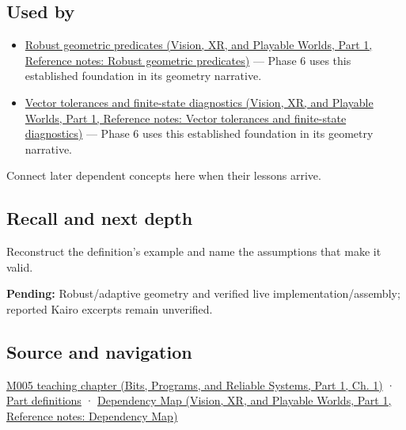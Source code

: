 \subsection{Used by}\label{appendix-5aef4f13483a-used-by}

\hypertarget{appendix-5aef4f13483a-used-by}{}

\begin{itemize}
\tightlist
\item
  \href{../07-Vision-XR-and-Playable-Worlds-P01/main.pdf\#nameddest=appendix-341296fb3f64}{Robust geometric predicates (Vision, XR, and Playable Worlds, Part 1, Reference notes: Robust geometric predicates)} --- Phase 6 uses this established foundation in its geometry narrative.
\item
  \href{../07-Vision-XR-and-Playable-Worlds-P01/main.pdf\#nameddest=appendix-b5b83329215b}{Vector tolerances and finite-state diagnostics (Vision, XR, and Playable Worlds, Part 1, Reference notes: Vector tolerances and finite-state diagnostics)} --- Phase 6 uses this established foundation in its geometry narrative.
\end{itemize}

Connect later dependent concepts here when their lessons arrive.

\subsection{Recall and next depth}\label{appendix-5aef4f13483a-recall-and-next-depth}

\hypertarget{appendix-5aef4f13483a-recall-and-next-depth}{}

Reconstruct the definition's example and name the assumptions that make it valid.

\textbf{Pending:} Robust/adaptive geometry and verified live implementation/assembly; reported Kairo excerpts remain unverified.

\subsection{Source and navigation}\label{appendix-5aef4f13483a-source-and-navigation}

\hypertarget{appendix-5aef4f13483a-source-and-navigation}{}

\href{../01-Bits-Programs-and-Reliable-Systems-P01/main.pdf\#nameddest=01-foundations-i-ch001-when-arithmetic-meets-uncertainty}{M005 teaching chapter (Bits, Programs, and Reliable Systems, Part 1, Ch. 1)} · \hyperref[appendix-fd090d982a15-m005---parts-77-88]{Part definitions} · \href{../07-Vision-XR-and-Playable-Worlds-P01/main.pdf\#nameddest=appendix-4ad47bdd269a}{Dependency Map (Vision, XR, and Playable Worlds, Part 1, Reference notes: Dependency Map)}

